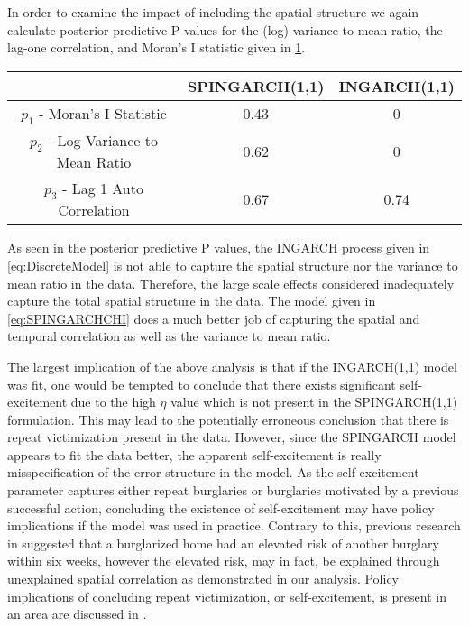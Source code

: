 \documentclass[11pt]{isuthesis}
\begin{document}
In order to examine the impact of including the spatial structure we again calculate posterior predictive P-values for the (log) variance to mean ratio, the lag-one correlation, and Moran's I statistic given in \ref{Table:Pvals}.  
\begin{table}[!htp]
	 \label{Table:Pvals} 
	\begin{center}
		\begin{tabular}{ |c|c|c| } 
			\hline
			& SPINGARCH(1,1) & INGARCH(1,1)\\
			\hline 
			$p_1$ - Moran's I Statistic& 0.43 & 0 \\
			$p_2$ - Log Variance to Mean Ratio & 0.62 & 0\\
			$p_3$ - Lag 1 Auto Correlation & 0.67 & 0.74 \\ 
			\hline
		\end{tabular}
	\end{center}
\end{table}
As seen in the posterior predictive P values, the INGARCH process given in \eqref{eq:DiscreteModel} is not able to capture the spatial structure nor the variance to mean ratio in the data.  Therefore, the large scale effects considered inadequately capture the total spatial structure in the data. The model given in \eqref{eq:SPINGARCHCHI} does a much better job of capturing the spatial and temporal correlation as well as the variance to mean ratio. 

The largest implication of the above analysis is that if the INGARCH(1,1) model was fit, one would be tempted to conclude that there exists significant self-excitement due to the high $\eta$ value which is not present in the SPINGARCH(1,1) formulation.  This may lead to the potentially erroneous conclusion that there is repeat victimization present in the data.   However, since the SPINGARCH model appears to fit the data better, the apparent self-excitement is really misspecification of the error structure in the model.  As the self-excitement parameter captures either repeat burglaries or burglaries motivated by a previous successful action, concluding the existence of self-excitement may have policy implications if the model was used in practice.  Contrary to this, previous research in \cite{polvi1991time} suggested that a burglarized home had an elevated risk of another burglary within six weeks, however the elevated risk, may in fact, be explained through unexplained spatial correlation as demonstrated in our analysis.  Policy implications of concluding repeat victimization, or self-excitement, is present in an area are discussed in \cite{pease1998repeat}.  
\end{document}
